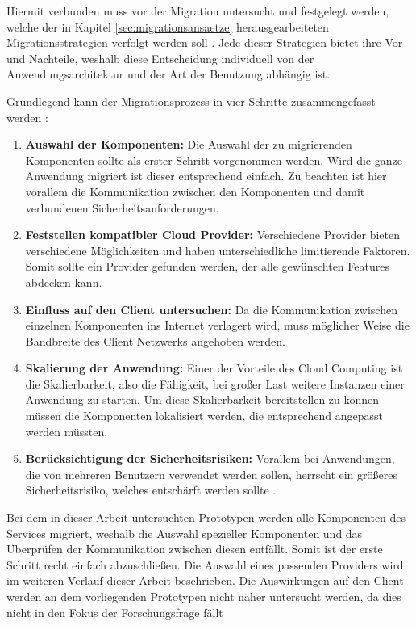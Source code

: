Hiermit verbunden muss vor der Migration untersucht und festgelegt werden, welche der in Kapitel \ref{sec:migrationsansaetze} herausgearbeiteten Migrationsstrategien verfolgt werden soll \cite[Vgl.][10:38-13:23min]{AWS2019}. Jede dieser Strategien bietet ihre Vor- und Nachteile, weshalb diese Entscheidung individuell von der Anwendungsarchitektur und der Art der Benutzung abhängig ist.

Grundlegend kann der Migrationsprozess  in vier Schritte zusammengefasst werden \cite[Vgl. auch im Folgenden][S. 34ff]{Maenhaut2016}:
\begin{enumerate}
\item \textbf{Auswahl der Komponenten:} Die Auswahl der zu migrierenden Komponenten sollte als erster Schritt vorgenommen werden. Wird die ganze Anwendung migriert ist dieser entsprechend einfach. Zu beachten ist hier vorallem die Kommunikation zwischen den Komponenten und damit verbundenen Sicherheitsanforderungen.
\item \textbf{Feststellen kompatibler Cloud Provider:} Verschiedene Provider bieten verschiedene Möglichkeiten und haben unterschiedliche limitierende Faktoren. Somit sollte ein Provider gefunden werden, der alle gewünschten Features abdecken kann.
\item \textbf{Einfluss auf den Client untersuchen:} Da die Kommunikation zwischen einzelnen Komponenten ins Internet verlagert wird, muss möglicher Weise die Bandbreite des Client Netzwerks angehoben werden.
\item \textbf{Skalierung der Anwendung:} Einer der Vorteile des Cloud Computing ist die Skalierbarkeit, also die Fähigkeit, bei großer Last weitere Instanzen einer Anwendung zu starten. Um diese Skalierbarkeit bereitstellen zu können müssen die Komponenten lokalisiert werden, die entsprechend angepasst werden müssten.
\item \textbf{Berücksichtigung der Sicherheitsrisiken:} Vorallem bei Anwendungen, die von mehreren Benutzern verwendet werden sollen, herrscht ein größeres Sicherheitsrisiko, welches entschärft werden sollte \cite[Vgl.][S. 38]{Maenhaut2016}.
\end{enumerate}


Bei dem in dieser Arbeit untersuchten Prototypen werden alle Komponenten des Services migriert, weshalb die Auswahl spezieller Komponenten und das Überprüfen der Kommunikation zwischen diesen entfällt. Somit ist der erste Schritt recht einfach abzuschließen. Die Auswahl eines passenden Providers wird im weiteren Verlauf dieser Arbeit beschrieben. Die Auswirkungen auf den Client werden an dem vorliegenden Prototypen nicht näher untersucht werden, da dies nicht in den Fokus der Forschungsfrage fällt \pagebreak

